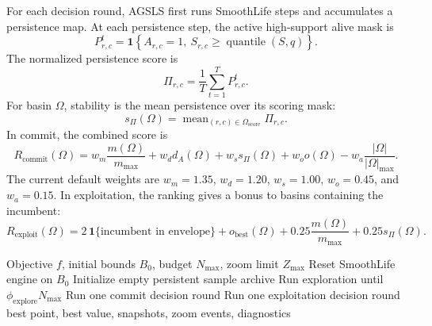 \documentclass[11pt]{article}
\newcommand{\mean}{\operatorname{mean}}
\begin{document}
For each decision round, AGSLS first runs SmoothLife steps and accumulates a
persistence map. At each persistence step, the active high-support alive mask
is
\begin{equation}
P^t_{r,c}
= \mathbf{1}\left\{A_{r,c}=1,\ S_{r,c}\ge
\operatorname{quantile}(S,q)\right\}.
\label{eq:persistence-step}
\end{equation}
The normalized persistence score is
\begin{equation}
\Pi_{r,c} = \frac{1}{T}\sum_{t=1}^{T}P^t_{r,c}.
\label{eq:persistence}
\end{equation}
For basin $\Omega$, stability is the mean persistence over its scoring mask:
\begin{equation}
s_{\Pi}(\Omega)=\mean_{(r,c)\in\Omega_{\mathrm{score}}}\Pi_{r,c}.
\label{eq:stability}
\end{equation}
In commit, the combined score is
\begin{equation}
R_{\mathrm{commit}}(\Omega)
= w_m\frac{m(\Omega)}{m_{\max}}
+ w_d d_A(\Omega)
+ w_s s_{\Pi}(\Omega)
+ w_o o(\Omega)
- w_a\frac{|\Omega|}{|\Omega|_{\max}}.
\label{eq:commit-ranking}
\end{equation}
The current default weights are
$w_m=1.35$, $w_d=1.20$, $w_s=1.00$, $w_o=0.45$, and $w_a=0.15$.
In exploitation, the ranking gives a bonus to basins containing the incumbent:
\begin{equation}
R_{\mathrm{exploit}}(\Omega)
= 2\,\mathbf{1}\{\text{incumbent in envelope}\}
+ o_{\mathrm{best}}(\Omega)
+0.25\frac{m(\Omega)}{m_{\max}}
+0.25s_{\Pi}(\Omega).
\label{eq:exploit-ranking}
\end{equation}

\begin{algorithm}
\caption{AGSLS run loop}
\begin{algorithmic}[1]
\Require Objective $f$, initial bounds $B_0$, budget $N_{\max}$, zoom limit $Z_{\max}$
\State Reset SmoothLife engine on $B_0$
\State Initialize empty persistent sample archive
\State Run exploration until $\phi_{\mathrm{explore}}N_{\max}$
    \State Run one commit decision round
\EndWhile
{}
    \State Run one exploitation decision round
\EndWhile
\State \Return best point, best value, snapshots, zoom events, diagnostics
\end{algorithmic}
\label{alg:agsls-run}
\end{algorithm}
\end{document}
